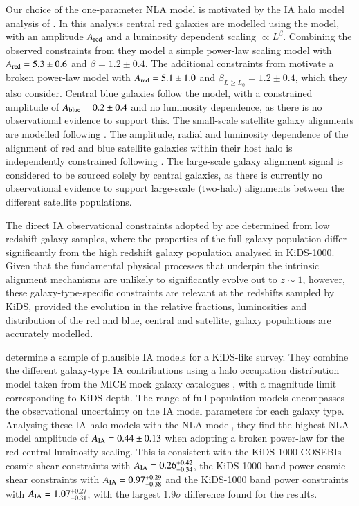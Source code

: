 \begin{appendix}
Our choice of the one-parameter NLA model is motivated by the IA halo model analysis of \citet{fortuna/etal:2020}.   In this analysis central red galaxies are modelled using the  \citet{hirata/seljak:2004} model, with an amplitude $A_{\rm red}$ and a luminosity dependent scaling $\propto L^\beta$.   Combining the observed constraints from \citet{joachimi/etal:2011, singh/etal:2015} they model a simple power-law scaling model with $A_{\rm red} = 5.3 \pm 0.6$ and $\beta=1.2 \pm 0.4$.   The additional constraints from \citet{johnston/etal:2019} motivate a broken power-law model with $A_{\rm red} = 5.1 \pm 1.0$ and $\beta_{L \geq L_0}=1.2 \pm 0.4$, which they also consider.    Central blue galaxies follow the \citet{hirata/seljak:2004} model, with a \citet{johnston/etal:2019} constrained amplitude of $A_{\rm blue} = 0.2 \pm 0.4$ and no luminosity dependence, as there is no observational evidence to support this.    The small-scale satellite galaxy alignments are modelled following \citet{schneider/bridle:2010}.  The amplitude, radial and luminosity dependence of the alignment of red and blue satellite galaxies within their host halo is independently constrained following \citet{georgiou/etal:2019}.     The large-scale galaxy alignment signal is considered to be sourced solely by central galaxies, as there is currently no observational evidence to support large-scale (two-halo) alignments between the different satellite populations.

The direct IA observational constraints adopted by \citet{fortuna/etal:2020} are determined from low redshift galaxy samples, where the properties of the full galaxy population differ significantly from the high redshift galaxy population analysed in KiDS-1000.  Given that the fundamental physical processes that underpin the intrinsic alignment mechanisms are unlikely to significantly evolve out to $z \sim 1$, however, these galaxy-type-specific constraints are relevant at the redshifts sampled by KiDS, provided the evolution in the relative fractions, luminosities and distribution of the red and blue, central and satellite, galaxy populations are accurately modelled.   

\citet{fortuna/etal:2020} determine a sample of plausible IA models for a KiDS-like survey.  They combine the different galaxy-type IA contributions using a halo occupation distribution model taken from the MICE mock galaxy catalogues \citep{fosalba/etal:2015}, with a magnitude limit corresponding to KiDS-depth.   The range of full-population models encompasses the observational uncertainty on the IA model parameters for each galaxy type.    Analysing these IA halo-models with the NLA model, they find the highest NLA model amplitude of $A_{\rm IA}=0.44 \pm 0.13$ when adopting a broken power-law for the red-central luminosity scaling.    This is consistent with the \citet{asgari/etal:2020} KiDS-1000 COSEBIs cosmic shear constraints with $A_{\rm IA}=0.26 ^{+0.42}_{-0.34}$, the KiDS-1000 band power cosmic shear constraints with $A_{\rm IA}=0.97 ^{+0.29}_{-0.38}$ and the KiDS-1000 \tttp band power constraints with $A_{\rm IA}=1.07^{+0.27}_{-0.31}$, with the largest $1.9 \sigma$ difference found for the \tttp results.    


\end{appendix}
